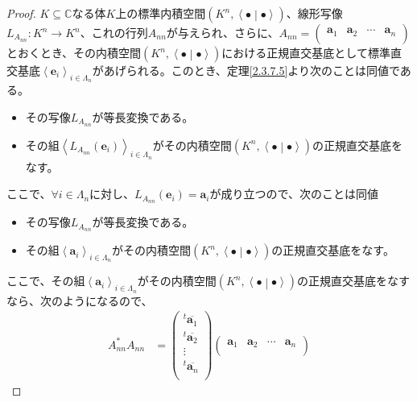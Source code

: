 \documentclass[dvipdfmx]{jsarticle}
\begin{document}
\begin{proof}
$K \subseteq \mathbb{C}$なる体$K$上の標準内積空間$\left( K^{n},\left\langle \bullet \middle| \bullet \right\rangle \right)$、線形写像$L_{A_{nn}}:K^{n} \rightarrow K^{n}$、これの行列$A_{nn}$が与えられ、さらに、$A_{nn} = \begin{pmatrix}
\mathbf{a}_{1} & \mathbf{a}_{2} & \cdots & \mathbf{a}_{n} \\
\end{pmatrix}$とおくとき、その内積空間$\left( K^{n},\left\langle \bullet \middle| \bullet \right\rangle \right)$における正規直交基底として標準直交基底$\left\langle \mathbf{e}_{i} \right\rangle_{i \in \varLambda_{n}}$があげられる。このとき、定理\ref{2.3.7.5}より次のことは同値である。
\begin{itemize}
\item
  その写像$L_{A_{nn}}$が等長変換である。
\item
  その組$\left\langle L_{A_{nn}}\left( \mathbf{e}_{i} \right) \right\rangle_{i \in \varLambda_{n}}$がその内積空間$\left( K^{n},\left\langle \bullet \middle| \bullet \right\rangle \right)$の正規直交基底をなす。
\end{itemize}
ここで、$\forall i \in \varLambda_{n}$に対し、$L_{A_{nn}}\left( \mathbf{e}_{i} \right) = \mathbf{a}_{i}$が成り立つので、次のことは同値
\begin{itemize}
\item
  その写像$L_{A_{nn}}$が等長変換である。
\item
  その組$\left\langle \mathbf{a}_{i} \right\rangle_{i \in \varLambda_{n}}$がその内積空間$\left( K^{n},\left\langle \bullet \middle| \bullet \right\rangle \right)$の正規直交基底をなす。
\end{itemize}\par
ここで、その組$\left\langle \mathbf{a}_{i} \right\rangle_{i \in \varLambda_{n}}$がその内積空間$\left( K^{n},\left\langle \bullet \middle| \bullet \right\rangle \right)$の正規直交基底をなすなら、次のようになるので、
\begin{align*}
A_{nn}^{*}A_{nn} &= \begin{pmatrix}
^{t}\overline{\mathbf{a}_{1}} \\
^{t}\overline{\mathbf{a}_{2}} \\
 \vdots \\
^{t}\overline{\mathbf{a}_{n}} \\
\end{pmatrix}\begin{pmatrix}
\mathbf{a}_{1} & \mathbf{a}_{2} & \cdots & \mathbf{a}_{n} \\

\end{pmatrix}
\end{align*}
\end{proof}
\end{document}
